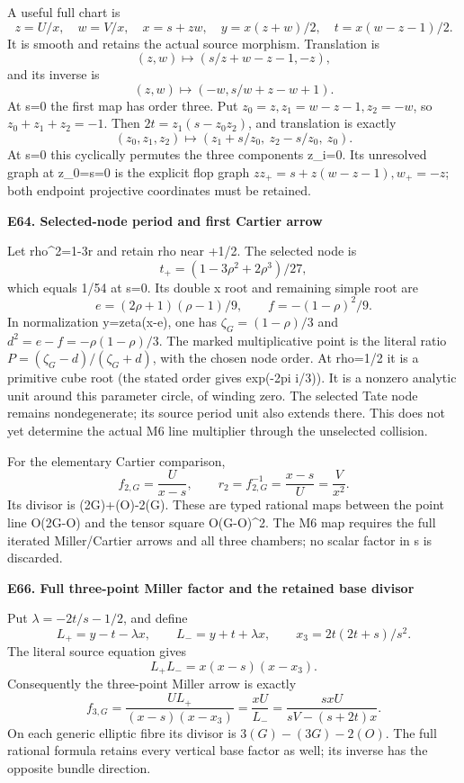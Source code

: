 A useful full chart is
\[
 z=U/x,\quad w=V/x,\quad x=s+zw,\quad
 y=x(z+w)/2,\quad t=x(w-z-1)/2.
\]
It is smooth and retains the actual source morphism. Translation is
\[
 (z,w)\longmapsto(s/z+w-z-1,-z),
\]
and its inverse is
\[
 (z,w)\longmapsto(-w,s/w+z-w+1).
\]
At s=0 the first map has order three. Put
\(z_0=z,z_1=w-z-1,z_2=-w\), so \(z_0+z_1+z_2=-1\).
Then \(2t=z_1(s-z_0z_2)\), and translation is exactly
\[
 (z_0,z_1,z_2)\longmapsto
 (z_1+s/z_0,\ z_2-s/z_0,\ z_0).
\]
At s=0 this cyclically permutes the three components z\_i=0.
Its unresolved graph at z\_0=s=0 is the explicit flop graph
\(z z_+=s+z(w-z-1), w_+=-z\); both endpoint projective coordinates
must be retained.

\par

\medskip\noindent\textbf{E64. Selected-node period and first Cartier arrow}

\par\nobreak

Let rho\^{}2=1-3r and retain rho near +1/2. The selected node is
\[
 t_+=(1-3\rho^2+2\rho^3)/27,
\]
which equals 1/54 at s=0. Its double x root and remaining simple root are
\[
 e=(2\rho+1)(\rho-1)/9,\qquad f=-(1-\rho)^2/9.
\]
In normalization y=zeta(x-e), one has
\(\zeta_G=(1-\rho)/3\) and
\(d^2=e-f=-\rho(1-\rho)/3\).
The marked multiplicative point is the literal ratio
\(P=(\zeta_G-d)/(\zeta_G+d)\), with the chosen node order.
At rho=1/2 it is a primitive cube root (the stated order gives
exp(-2pi i/3)). It is a nonzero analytic unit around this parameter
circle, of winding zero. The selected Tate node remains nondegenerate;
its source period unit also extends there. This does not yet determine
the actual M6 line multiplier through the unselected collision.

For the elementary Cartier comparison,
\[
 f_{2,G}=\frac{U}{x-s},\qquad r_2=f_{2,G}^{-1}
       =\frac{x-s}{U}=\frac{V}{x^2}.
\]
Its divisor is (2G)+(O)-2(G). These are typed rational maps between
the point line O(2G-O) and the tensor square O(G-O)\^{}2. The M6 map
requires the full iterated Miller/Cartier arrows and all three
chambers; no scalar factor in s is discarded.

\par

\medskip\noindent\textbf{E66. Full three-point Miller factor and the retained base divisor}

\par\nobreak

Put \(\lambda=-2t/s-1/2\), and define
\[
 L_+=y-t-\lambda x,\qquad L_-=y+t+\lambda x,\qquad
 x_3=2t(2t+s)/s^2 .
\]
The literal source equation gives
\[
 L_+L_-=x(x-s)(x-x_3).
\]
Consequently the three-point Miller arrow is exactly
\[
 f_{3,G}=\frac{U L_+}{(x-s)(x-x_3)}
        =\frac{xU}{L_-}
        =\frac{s xU}{sV-(s+2t)x}.
\]
On each generic elliptic fibre its divisor is \(3(G)-(3G)-2(O)\).
The full rational formula retains every vertical base factor as well;
its inverse has the opposite bundle direction.

